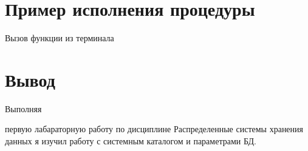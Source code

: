 \section{Пример исполнения процедуры}
\hypertarget{p3}{Вызов функции из терминала}

\section{Вывод}
\hypertarget{p4}{Выполняя} первую лабараторную работу по дисциплине Распределенные системы хранения данных я изучил работу с системным каталогом и параметрами БД.

